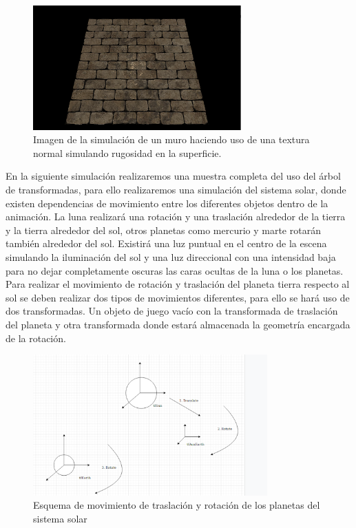 \documentclass[a4paper]{book}
\begin{document}
\begin{figure}[H]
    \centering
    \includegraphics[width=8cm, keepaspectratio]{img/WallResult.png}
    \caption{Imagen de la simulación de un muro haciendo uso de una textura normal simulando rugosidad en la superficie.}
    \label{WallResult}
\end{figure}

En la siguiente simulación realizaremos una muestra completa del uso del árbol de transformadas, para ello realizaremos
una simulación del sistema solar, donde existen dependencias de movimiento entre los diferentes objetos dentro de la
animación. La luna realizará una rotación y una traslación alrededor de la tierra y la tierra alrededor del sol, otros
planetas como mercurio y marte rotarán también alrededor del sol. Existirá una luz puntual en el centro de la escena
simulando la  iluminación del sol y una luz direccional con una intensidad baja para no dejar completamente oscuras
las caras ocultas de la luna o los planetas. Para realizar el movimiento de rotación y traslación del planeta tierra respecto al
sol se deben realizar dos tipos de movimientos diferentes, para ello se hará uso de dos transformadas. Un objeto de juego vacío
con la transformada de traslación del planeta y otra transformada donde estará almacenada la geometría encargada de la rotación.

\begin{figure}[H]
    \centering
    \includegraphics[width=9cm, keepaspectratio]{img/SolarMove.png}
    \caption{Esquema de movimiento de traslación y rotación de los planetas del sistema solar}
    \label{SolarMove}
\end{figure}
\end{document}
